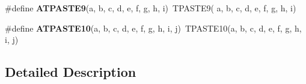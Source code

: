 \begin{DoxyCompactItemize}
\item 
\hypertarget{group__group__sam0__utils__tpaste_ga5305e79258b2256febfac6ebec8838c2}{}\#define {\bfseries A\+T\+P\+A\+S\+T\+E9}(a,  b,  c,  d,  e,  f,  g,  h,  i)~T\+P\+A\+S\+T\+E9( a, b, c, d, e, f, g, h, i)\label{group__group__sam0__utils__tpaste_ga5305e79258b2256febfac6ebec8838c2}

\item 
\hypertarget{group__group__sam0__utils__tpaste_ga3b9c4ca2ffbcec13ec3083ab95664ac9}{}\#define {\bfseries A\+T\+P\+A\+S\+T\+E10}(a,  b,  c,  d,  e,  f,  g,  h,  i,  j)~T\+P\+A\+S\+T\+E10(a, b, c, d, e, f, g, h, i, j)\label{group__group__sam0__utils__tpaste_ga3b9c4ca2ffbcec13ec3083ab95664ac9}

\end{DoxyCompactItemize}


\subsection{Detailed Description}
